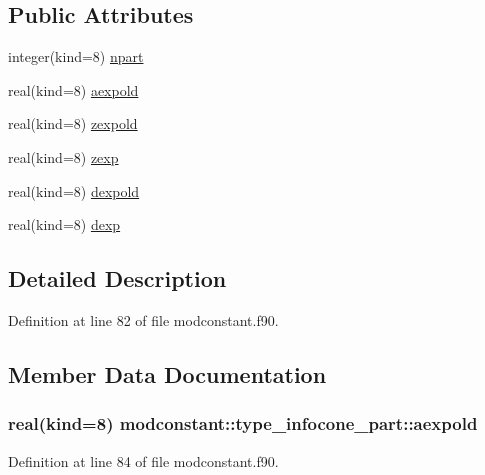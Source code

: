\subsection*{Public Attributes}
\begin{DoxyCompactItemize}
\item 
integer(kind=8) \hyperlink{structmodconstant_1_1type__infocone__part_a7316d0f4db343f9dc87c45f241642f4f}{npart}
\item 
real(kind=8) \hyperlink{structmodconstant_1_1type__infocone__part_a8a178eeb6847ac2b7456b5ff8b3edd24}{aexpold}
\item 
real(kind=8) \hyperlink{structmodconstant_1_1type__infocone__part_a6bc976cbbe5cd3d696c2c9d0b5095c70}{zexpold}
\item 
real(kind=8) \hyperlink{structmodconstant_1_1type__infocone__part_adef877fd872e2e87bfbb3973af57aae1}{zexp}
\item 
real(kind=8) \hyperlink{structmodconstant_1_1type__infocone__part_af5a8f128638e0474edb01932dfd4dec7}{dexpold}
\item 
real(kind=8) \hyperlink{structmodconstant_1_1type__infocone__part_a0395444224fda81aaed35febb5cc9d82}{dexp}
\end{DoxyCompactItemize}


\subsection{Detailed Description}


Definition at line 82 of file modconstant.\-f90.



\subsection{Member Data Documentation}
\hypertarget{structmodconstant_1_1type__infocone__part_a8a178eeb6847ac2b7456b5ff8b3edd24}{
\subsubsection[{aexpold}]{\setlength{\rightskip}{0pt plus 5cm}real(kind=8) modconstant\-::type\-\_\-infocone\-\_\-part\-::aexpold}}\label{structmodconstant_1_1type__infocone__part_a8a178eeb6847ac2b7456b5ff8b3edd24}


Definition at line 84 of file modconstant.\-f90.

